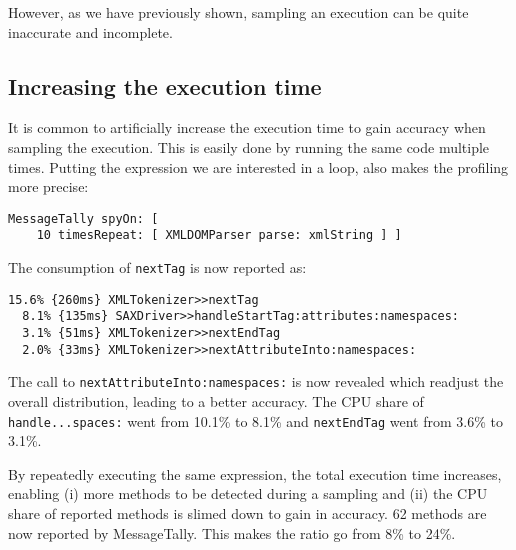 \documentclass{sig-alternate}
\newcommand{\ct}{\lstinline[backgroundcolor=\color{white},basicstyle=\footnotesize\ttfamily]}
\begin{document}
However, as we have previously shown, sampling an execution can be quite inaccurate and incomplete. 

\subsection{Increasing the execution time}


It is common to artificially increase the execution time to gain accuracy when sampling the execution. This is easily done by running the same code multiple times. Putting the expression we are interested in a loop, also makes the profiling more precise:

\begin{lstlisting}
MessageTally spyOn: [  
	10 timesRepeat: [ XMLDOMParser parse: xmlString ] ]
\end{lstlisting}

The consumption of \ct{nextTag} is now reported as:

\begin{lstlisting}
15.6% {260ms} XMLTokenizer>>nextTag
  8.1% {135ms} SAXDriver>>handleStartTag:attributes:namespaces:
  3.1% {51ms} XMLTokenizer>>nextEndTag
  2.0% {33ms} XMLTokenizer>>nextAttributeInto:namespaces:
\end{lstlisting}

The call to \ct{nextAttributeInto:namespaces:} is now revealed which readjust the overall distribution, leading to a better accuracy. The CPU share of \ct{handle...spaces:} went from 10.1\% to 8.1\% and \ct{nextEndTag} went from 3.6\% to 3.1\%.

By repeatedly executing the same expression, the total execution time increases, enabling (i) more methods to be detected during a sampling and (ii) the CPU share of reported methods is slimed down to gain in accuracy. 62 methods are now reported by MessageTally. This makes the ratio go from 8\% to 24\%.

\end{document}
